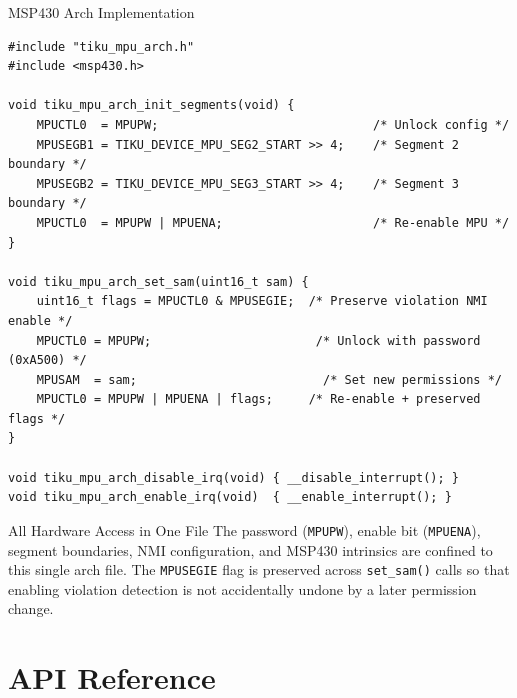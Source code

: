 \documentclass[aspectratio=169, 10pt]{beamer}
\begin{document}
\begin{frame}[fragile]{MSP430 Arch Implementation}
\begin{lstlisting}[style=cstyle, title={arch/msp430/tiku\_mpu\_arch.c}]
#include "tiku_mpu_arch.h"
#include <msp430.h>

void tiku_mpu_arch_init_segments(void) {
    MPUCTL0  = MPUPW;                              /* Unlock config */
    MPUSEGB1 = TIKU_DEVICE_MPU_SEG2_START >> 4;    /* Segment 2 boundary */
    MPUSEGB2 = TIKU_DEVICE_MPU_SEG3_START >> 4;    /* Segment 3 boundary */
    MPUCTL0  = MPUPW | MPUENA;                     /* Re-enable MPU */
}

void tiku_mpu_arch_set_sam(uint16_t sam) {
    uint16_t flags = MPUCTL0 & MPUSEGIE;  /* Preserve violation NMI enable */
    MPUCTL0 = MPUPW;                       /* Unlock with password (0xA500) */
    MPUSAM  = sam;                          /* Set new permissions */
    MPUCTL0 = MPUPW | MPUENA | flags;     /* Re-enable + preserved flags */
}

void tiku_mpu_arch_disable_irq(void) { __disable_interrupt(); }
void tiku_mpu_arch_enable_irq(void)  { __enable_interrupt(); }
\end{lstlisting}

\vspace{0.3em}
\begin{alertblock}{All Hardware Access in One File}
The password (\texttt{MPUPW}), enable bit (\texttt{MPUENA}), segment
boundaries, NMI configuration, and MSP430 intrinsics are confined to this
single arch file. The \texttt{MPUSEGIE} flag is preserved across
\texttt{set\_sam()} calls so that enabling violation detection is not
accidentally undone by a later permission change.
\end{alertblock}
\end{frame}

\section{API Reference}
\end{document}
